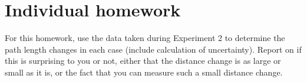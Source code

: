 \section{Individual homework}

For this homework, use the data taken during Experiment 2 to determine the path length changes in each case (include calculation of uncertainty). Report on if this is surprising to you or not, either that the distance change is as large or small as it is, or the fact that you can measure such a small distance change.
